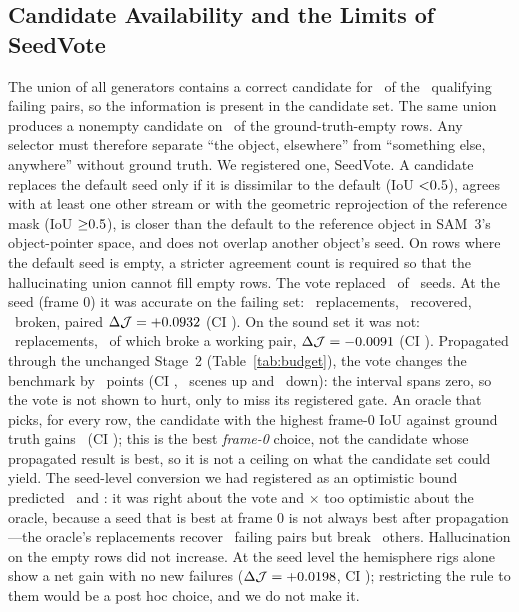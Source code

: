 \documentclass[journal]{IEEEtran}
\newcommand{\Jscore}{\ensuremath{\mathcal{J}}}
\begin{document}
\subsection{Candidate Availability and the Limits of SeedVote}
\label{sec:cands}
The union of all generators contains a correct candidate for \unionOracle\ of
the \nQualPairs\ qualifying failing pairs, so the information is present in
the candidate set. The same union produces a nonempty candidate on
\unionHalluc\ of the ground-truth-empty rows. Any selector must therefore
separate ``the object, elsewhere'' from ``something else, anywhere'' without
ground truth. We registered one, SeedVote. A candidate replaces the default
seed only if it is dissimilar to the default (IoU ${<}0.5$), agrees with
at least one other stream or with the geometric reprojection of the reference
mask (IoU ${\geq}0.5$), is closer than the default to the reference object
in SAM~3's object-pointer space, and does not overlap another object's seed. On
rows where the default seed is empty, a stricter agreement count is required so
that the hallucinating union cannot fill empty rows. The vote replaced \nVoteReplaced\ of \nGtPresent\ seeds. At the seed (frame 0)
it was accurate on the failing set: \voteFzeroRep\
replacements, \voteFzeroRec\ recovered, \voteFzeroBroke\ broken, paired
$\Delta\Jscore=\voteFzeroDJ$ (CI \voteFzeroCI). On the sound set it was not:
\voteNzeroRep\ replacements, \voteNzeroBroke\ of which broke a working pair,
$\Delta\Jscore=\voteNzeroDJ$ (CI \voteNzeroCI). Propagated through the unchanged Stage~2 (Table~\ref{tab:budget}), the vote
changes the benchmark by \voteReal\ points (CI \voteRealCI, \voteWins\ scenes
up and \voteLosses\ down): the interval spans zero, so the vote is not shown
to hurt, only to miss its registered gate. An oracle that picks, for every
row, the candidate with the highest frame-0 IoU against ground truth gains
\oracleReal\ (CI \oracleRealCI); this is the best \emph{frame-0} choice, not
the candidate whose propagated result is best, so it is not a ceiling on what
the candidate set could yield. The seed-level conversion we had registered as an optimistic
bound predicted \voteRule\ and \voteOracle: it was right about the vote and
\oracleOverestimate$\times$ too optimistic about the oracle, because a seed
that is best at frame 0 is not always best after propagation---the oracle's
replacements recover \oracleFzeroRec\ failing pairs but break
\oracleFzeroBroke\ others. Hallucination on the empty rows did not increase.
At the seed level the hemisphere rigs alone show a net gain with no new
failures ($\Delta\Jscore=\voteHemiDJ$, CI \voteHemiCI); restricting the rule to
them would be a post hoc choice, and we do not make it.
\end{document}
